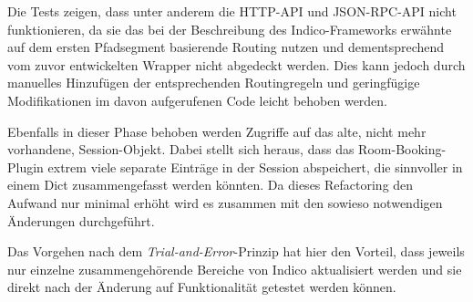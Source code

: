 Die Tests zeigen, dass unter anderem die HTTP-API und JSON-RPC-API nicht funktionieren, da sie das
bei der Beschreibung des Indico-Frameworks erwähnte auf dem ersten Pfadsegment basierende Routing
nutzen und dementsprechend vom zuvor entwickelten Wrapper nicht abgedeckt werden. Dies kann jedoch
durch manuelles Hinzufügen der entsprechenden Routingregeln und geringfügige Modifikationen im davon
aufgerufenen Code leicht behoben werden.

Ebenfalls in dieser Phase behoben werden Zugriffe auf das alte, nicht mehr vorhandene,
Session-Objekt. Dabei stellt sich heraus, dass das Room-Booking-Plugin extrem viele separate
Einträge in der Session abspeichert, die sinnvoller in einem Dict zusammengefasst werden könnten. Da
dieses Refactoring den Aufwand nur minimal erhöht wird es zusammen mit den sowieso notwendigen
Änderungen durchgeführt.

Das Vorgehen nach dem \emph{Trial-and-Error}-Prinzip hat hier den Vorteil, dass jeweils nur einzelne
zusammengehörende Bereiche von Indico aktualisiert werden und sie direkt nach der Änderung auf
Funktionalität getestet werden können.
